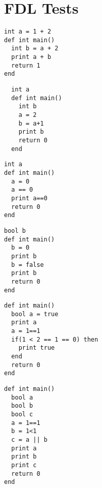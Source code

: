 \documentclass[11pt]{article}
\begin{document}
\newpage
\section{FDL Tests}

\begin{listing}[H]
  \begin{verbatim}
int a = 1 + 2
def int main()
  int b = a + 2
  print a + b
  return 1
end
  \end{verbatim}
\end{listing}

\begin{listing}[H]
  \begin{verbatim}
  int a
  def int main()
    int b
    a = 2
    b = a+1
    print b
    return 0
  end
  \end{verbatim}
\end{listing}

\begin{listing}[H]
  \begin{verbatim}
int a
def int main()
  a = 0
  a == 0
  print a==0
  return 0
end
  \end{verbatim}
\end{listing}

\begin{listing}[H]
  \begin{verbatim}
bool b
def int main()
  b = 0
  print b
  b = false
  print b
  return 0
end
  \end{verbatim}
\end{listing}

\begin{listing}[H]
  \begin{verbatim}
def int main()
  bool a = true
  print a
  a = 1==1
  if(1 < 2 == 1 == 0) then
    print true
  end
  return 0
end
  \end{verbatim}
\end{listing}

\begin{listing}[H]
  \begin{verbatim}
def int main()
  bool a
  bool b
  bool c
  a = 1==1
  b = 1<1
  c = a || b
  print a
  print b
  print c
  return 0
end

  \end{verbatim}
\end{listing}
\end{document}
